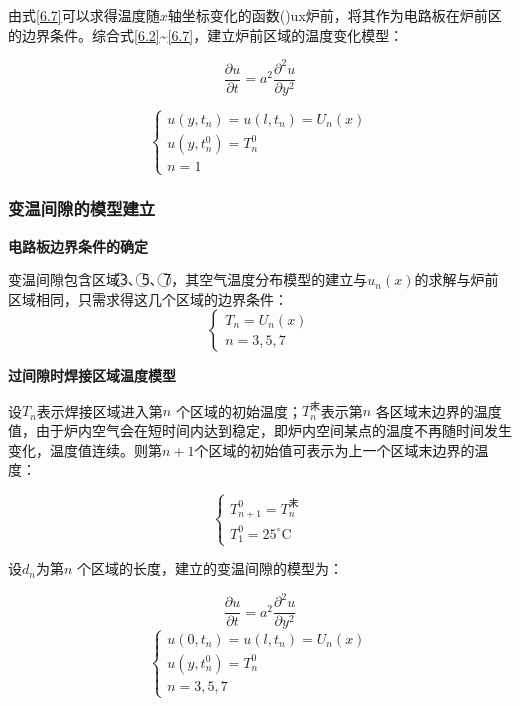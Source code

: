 \documentclass[withoutpreface,bwprint]{cumcmthesis} %
\numberwithin{equation}{subsection}
\begin{document}
由式\eqref{6.7}可以求得温度随$𝑥$轴坐标变化的函数()ux炉前，将其作为电路板在炉前区的边界条件。综合式\eqref{6.2}\~{}\eqref{6.7}，建立炉前区域的温度变化模型：

$$
\frac{\partial u}{\partial t}=a^{2} \frac{\partial^{2} u}{\partial y^{2}}
$$

\begin{equation}
	\left\{ \begin{array}{l}
		u\left(y,t_{n} \right) =u\left(l,t_{n} \right)=U_{n}(x)\\
		u\left(y,t_{n}^0 \right) =T_{n}^0\\
		n=1
	\end{array}\right.
	\label{6.8}
\end{equation}

\subsubsection{变温间隙的模型建立}

\noindent \textbf{电路板边界条件的确定}

变温间隙包含区域\textcircled{3}、\textcircled{5}、\textcircled{7}，其空气温度分布模型的建立与$u_{n}(x)$的求解与炉前区域相同，只需求得这几个区域的边界条件：
\begin{equation}
	\left\{\begin{array}{l}
		T_{n}=U_{n}(x)\\
		n=3,5,7
	\end{array}\right.
\end{equation}

\noindent \textbf{过间隙时焊接区域温度模型}

设$T_{n}$表示焊接区域进入第$𝑛$ 个区域的初始温度；$T_{n}^\text{末}$表示第$𝑛$ 各区域末边界的温度值，由于炉内空气会在短时间内达到稳定，即炉内空间某点的温度不再随时间发生变化，温度值连续。则第$𝑛 +1$个区域的初始值可表示为上一个区域末边界的温度：

\begin{equation}
	\left\{\begin{array}{l}
	T_{n+1}^{0}=T_{n}^{\text {末 }} \\
	T_{1}^{0}=25^{\circ} \mathrm{C}
	\end{array}\right.
\end{equation}

设$d_{n}$为第$𝑛$ 个区域的长度，建立的变温间隙的模型为：

$$
\frac{\partial u}{\partial t}=a^{2} \frac{\partial^{2} u}{\partial y^{2}}
$$
\begin{equation}
	\left\{\begin{array}{l}
	u\left(0, t_{n}\right)=u\left(l, t_{n}\right)=U_{n}(x) \\
	u\left(y, t_{n}^{0}\right)=T_{n}^{0} \\
	n=3,5,7
	\end{array}\right.
\end{equation}
\end{document}
